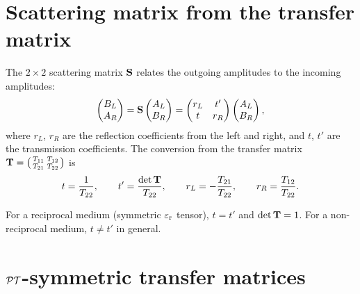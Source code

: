 \section{Scattering matrix from the transfer matrix}
\label{sec:transfer-to-scatter}

The $2 \times 2$ scattering matrix $\mathbf{S}$ relates the outgoing
amplitudes to the incoming amplitudes:
\begin{equation}
 \begin{pmatrix} B_L \\ A_R \end{pmatrix}
 = \mathbf{S}
 \begin{pmatrix} A_L \\ B_R \end{pmatrix}
 = \begin{pmatrix}
 r_L & t' \\
 t & r_R
 \end{pmatrix}
 \begin{pmatrix} A_L \\ B_R \end{pmatrix},
 \label{eq:smat-def}
\end{equation}
where $r_L$, $r_R$ are the reflection coefficients from the left and
right, and $t$, $t'$ are the transmission coefficients. The conversion
from the transfer matrix $\mathbf{T} = \bigl(\begin{smallmatrix}
T_{11} & T_{12} \\ T_{21} & T_{22} \end{smallmatrix}\bigr)$ is
\begin{equation}
 t = \frac{1}{T_{22}}, \qquad
 t' = \frac{\det\mathbf{T}}{T_{22}}, \qquad
 r_L = -\frac{T_{21}}{T_{22}}, \qquad
 r_R = \frac{T_{12}}{T_{22}}.
 \label{eq:transfer-to-scatter}
\end{equation}

For a reciprocal medium (symmetric $\varepsilon_{\mathrm{r}}$ tensor), $t = t'$ and
$\det\mathbf{T} = 1$. For a non-reciprocal medium, $t \neq t'$ in general.


\section{$\mathcal{PT}$-symmetric transfer matrices}
\label{sec:pt-transfer-app}

